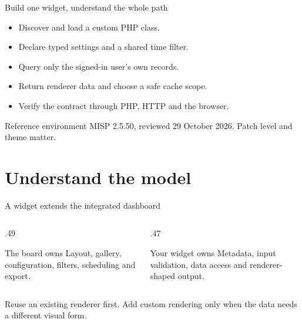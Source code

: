 \begin{frame}
  \titlepage
\end{frame}

\begin{frame}{Build one widget, understand the whole path}
  \begin{itemize}
    \item Discover and load a custom PHP class.
    \item Declare typed settings and a shared time filter.
    \item Query only the signed-in user's own records.
    \item Return renderer data and choose a safe cache scope.
    \item Verify the contract through PHP, HTTP and the browser.
  \end{itemize}
  \begin{block}{Reference environment}
    MISP 2.5.50, reviewed 29 October 2026. Patch level and theme matter.
  \end{block}
\end{frame}

\section{Understand the model}

\begin{frame}{A widget extends the integrated dashboard}
  \begin{columns}[T,onlytextwidth]
    \begin{column}{.49\textwidth}
      \begin{block}{The board owns}
        Layout, gallery, configuration, filters, scheduling and export.
      \end{block}
    \end{column}
    \begin{column}{.47\textwidth}
      \begin{block}{Your widget owns}
        Metadata, input validation, data access and renderer-shaped output.
      \end{block}
    \end{column}
  \end{columns}
  \medskip
  Reuse an existing renderer first. Add custom rendering only when the data
  needs a different visual form.
\end{frame}

